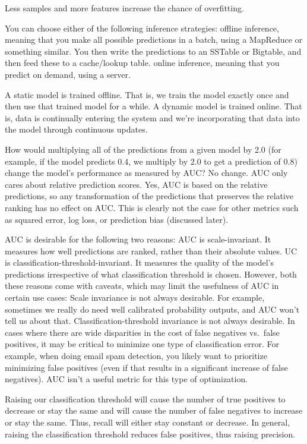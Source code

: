 \documentclass[]{book}
\begin{document}
Less samples and more features increase the chance of overfitting.

You can choose either of the following inference strategies: offline inference, meaning that you make all possible predictions in a batch, using a MapReduce or something similar. You then write the predictions to an SSTable or Bigtable, and then feed these to a cache/lookup table. online inference, meaning that you predict on demand, using a server.

A static model is trained offline. That is, we train the model exactly once and then use that trained model for a while. A dynamic model is trained online. That is, data is continually entering the system and we're incorporating that data into the model through continuous updates.

How would multiplying all of the predictions from a given model by 2.0 (for example, if the model predicts 0.4, we multiply by 2.0 to get a prediction of 0.8) change the model's performance as measured by AUC? No change. AUC only cares about relative prediction scores. Yes, AUC is based on the relative predictions, so any transformation of the predictions that preserves the relative ranking has no effect on AUC. This is clearly not the case for other metrics such as squared error, log loss, or prediction bias (discussed later).

AUC is desirable for the following two reasons: AUC is scale-invariant. It measures how well predictions are ranked, rather than their absolute values. UC is classification-threshold-invariant. It measures the quality of the model's predictions irrespective of what classification threshold is chosen. However, both these reasons come with caveats, which may limit the usefulness of AUC in certain use cases: Scale invariance is not always desirable. For example, sometimes we really do need well calibrated probability outputs, and AUC won't tell us about that. Classification-threshold invariance is not always desirable. In cases where there are wide disparities in the cost of false negatives vs.~false positives, it may be critical to minimize one type of classification error. For example, when doing email spam detection, you likely want to prioritize minimizing false positives (even if that results in a significant increase of false negatives). AUC isn't a useful metric for this type of optimization.

Raising our classification threshold will cause the number of true positives to decrease or stay the same and will cause the number of false negatives to increase or stay the same. Thus, recall will either stay constant or decrease. In general, raising the classification threshold reduces false positives, thus raising precision.
\end{document}
